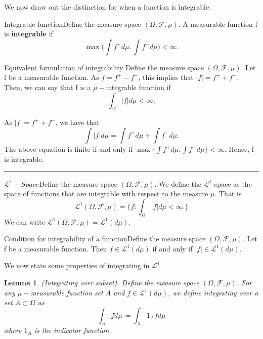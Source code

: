 \documentclass[twoside]{article}
\newtheorem{lemma}[theorem]{Lemma}
\newenvironment{proof}{{\bf Proof:}}{\hfill\rule{2mm}{2mm}}
\newcommand{\sigmalgebra}{\mathcal{F}}
\begin{document}
We now draw out the distinction for when a function is integrable.

\begin{definition_exam}{Integrable function}{}Define the measure space $(\Omega, \sigmalgebra, \mu)$. A measurable function f is \textbf{integrable} if 
$$
\max \bigg(\int f^+d\mu, \int f^-d\mu \bigg) < \infty. 
$$
\end{definition_exam}


\begin{proposition_exam}{Equivalent formulation of integrability}{}
Define the measure space $(\Omega, \sigmalgebra, \mu)$. Let f be a measurable function. As $f = f^+ - f^-$, this implies that $|f| = f^+ + f^-.$ Then, we can say that f is a $\mu-$integrable function if 
$$
\int_{\Omega}|f|d\mu < \infty.
$$
\end{proposition_exam}

\begin{proof} As $|f| = f^+ + f^-$, we have that 
$$
\int |f|d\mu = \int f^+d\mu + \int f^-d\mu.
$$
The above equation is finite if and only if $\max \{\int f^+d\mu, \int f^-d\mu\} < \infty$. Hence, f is integrable.
\end{proof}

\begin{definition_exam}{$\mathcal{L}^{1}-Space$}{}Define the measure space $(\Omega, \sigmalgebra, \mu)$. We define the $\mathcal{L}^{1}$-space as the space of functions that are integrable with respect to the measure $\mu$. That is 
$$
\mathcal{L}^{1}(\Omega, \sigmalgebra, \mu) = \{f: \int_{\Omega}|f|d\mu < \infty.\}
$$
We can write $\mathcal{L}^{1}(\Omega, \sigmalgebra, \mu) = \mathcal{L}^{1}(d\mu).$
\end{definition_exam}

\begin{proposition_exam}{Condition for integrability of a function}{}Define the measure space $(\Omega, \sigmalgebra, \mu)$. Let f be a measurable function. Then $f \in \mathcal{L}^{1}(d\mu)$ if and only if $|f| \in \mathcal{L}^{1}(d\mu).$
\end{proposition_exam}

We now state some properties of integrating in $\mathcal{L}^1.$

\begin{lemma}(Integrating over subset). Define the measure space $(\Omega, \sigmalgebra, \mu)$. For any $\mu-$measurable function set A and $f \in \mathcal{L}^1(d\mu)$, we define integrating over a set $A \subset \Omega$ as 
$$
\int_{A}fd\mu \coloneqq \int_{X}1_{A}fd\mu
$$
where $1_{A}$ is the indicator function.
\end{lemma}
\end{document}
